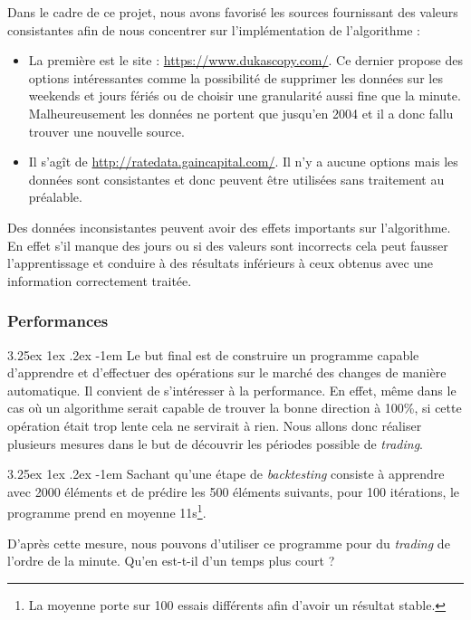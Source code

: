 \documentclass[a4paper, 11pt]{article}
\makeatletter
\renewcommand\paragraph{\@startsection{paragraph}{5}{\z@}%
  {3.25ex \@plus1ex \@minus.2ex}%
  {-1em}%
  {\normalfont\normalsize\bfseries}}
\makeatother
\begin{document}
Dans le cadre de ce projet, nous avons favorisé les sources fournissant des valeurs consistantes afin de nous concentrer sur l'implémentation de l'algorithme :
\begin{itemize}
	\item La première est le site : \url{https://www.dukascopy.com/}. Ce dernier propose des options intéressantes comme la possibilité de supprimer les données sur les weekends et jours fériés ou de choisir une granularité aussi fine que la minute. Malheureusement les données ne portent que jusqu'en 2004 et il a donc fallu trouver une nouvelle source.
	\item Il s'agît de \url{http://ratedata.gaincapital.com/}. Il n'y a aucune options mais les données sont consistantes et donc peuvent être utilisées sans traitement au préalable.
\end{itemize}

Des données inconsistantes peuvent avoir des effets importants sur l'algorithme. En effet s'il manque des jours ou si des valeurs sont incorrects cela peut fausser l'apprentissage et conduire à des résultats inférieurs à ceux obtenus avec une information correctement traitée.

\subsubsection{Performances}
\paragraph{}
Le but final est de construire un programme capable d'apprendre et d'effectuer des opérations sur le marché des changes de manière automatique. Il convient de s'intéresser à la performance. En effet, même dans le cas où un algorithme serait capable de trouver la bonne direction à 100\%, si cette opération était trop lente cela ne servirait à rien. Nous allons donc réaliser plusieurs mesures dans le but de découvrir les périodes possible de \textit{trading}.

\paragraph{}
Sachant qu'une étape de \textit{backtesting} consiste à apprendre avec 2000 éléments et de prédire les 500 éléments suivants, pour 100 itérations, le programme prend en moyenne 11s\footnote{La moyenne porte sur 100 essais différents afin d'avoir un résultat stable.}.

D'après cette mesure,  nous pouvons d'utiliser ce programme pour du \textit{trading} de l'ordre de la minute. Qu'en est-t-il d'un temps plus court ?
\end{document}
